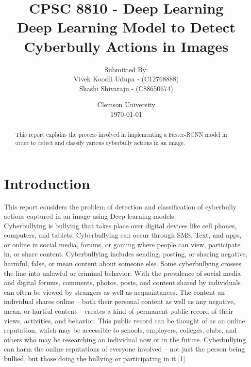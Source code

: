\documentclass[12pt]{article}
\title{\bf CPSC 8810 - Deep Learning\\
Deep Learning Model to Detect Cyberbully Actions in Images}
\author{Submitted By:\\	Vivek Koodli Udupa - (C12768888) \\
		Shashi Shivaraju - (C88650674)\\}
\date{Clemson University \\\today}
\begin{document}
\sloppy %
\begin{titlingpage}
\maketitle
{}%
\end{titlingpage}



\newpage
\begin{abstract}
\thispagestyle{plain}
This report explains the process involved in implementing a Faster-RCNN model in order to detect and classify various cyberbully actions in an image. 
\end{abstract}
\newpage

\section{Introduction}
This report considers the problem of detection and classification of cyberbully actions captured in an image using Deep learning models.  \\

Cyberbullying is bullying that takes place over digital devices like cell phones, computers, and tablets. Cyberbullying can occur through SMS, Text, and apps, or online in social media, forums, or gaming where people can view, participate in, or share content. Cyberbullying includes sending, posting, or sharing negative, harmful, false, or mean content about someone else. Some cyberbullying crosses the line into unlawful or criminal behavior. With the prevalence of social media and digital forums, comments, photos, posts, and content shared by individuals can often be viewed by strangers as well as acquaintances. The content an individual shares online – both their personal content as well as any negative, mean, or hurtful content – creates a kind of permanent public record of their views, activities, and behavior. This public record can be thought of as an online reputation, which may be accessible to schools, employers, colleges, clubs, and others who may be researching an individual now or in the future. Cyberbullying can harm the online reputations of everyone involved – not just the person being bullied, but those doing the bullying or participating in it.[1] \\ 
\end{document}
